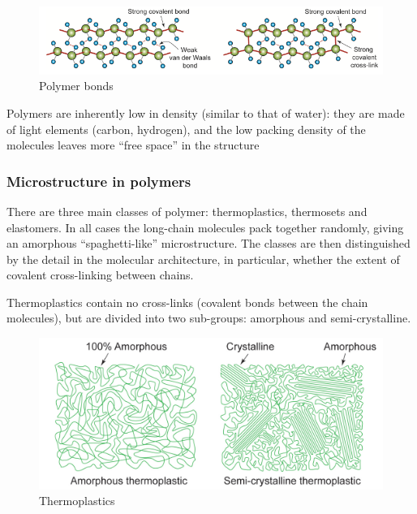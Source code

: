 \documentclass{article}
\begin{document}
\begin{figure}[h]
    \centering
    \includegraphics[width = 1\textwidth]{images/mat13.png}
    \caption{Polymer bonds}
    \label{fig:enter-label}
\end{figure}

Polymers are inherently low in density (similar to that of water): they are made of light elements (carbon, hydrogen), and the low packing density of the molecules leaves more “free space” in the structure

\subsubsection{Microstructure in polymers}

There are three main classes of polymer: thermoplastics, thermosets and elastomers. In all cases the long-chain molecules pack together randomly, giving an amorphous “spaghetti-like” microstructure. The classes are then distinguished by the detail in the molecular architecture, in particular, whether the extent of covalent cross-linking between chains.

\begin{definition}[Thermoplastics]
    Thermoplastics contain no cross-links (covalent bonds between the chain molecules), but are divided into two sub-groups: amorphous and semi-crystalline.
\end{definition}

\begin{figure}[h]
    \centering
    \includegraphics{images/mat14.png}
    \caption{Thermoplastics}
    \label{fig:enter-label}
\end{figure}
\end{document}
